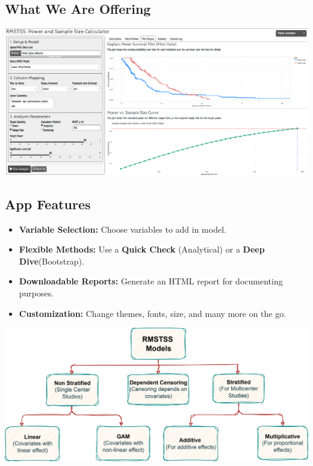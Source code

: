 \documentclass[a0,landscape]{a0poster}
\begin{document}
\hfill
\begin{minipage}[t]{0.54\linewidth}
    \subsection*{\huge What We Are Offering}
    \begin{center}
        \includegraphics[width=\linewidth]{images/app-ss.png}
    \end{center}
    \subsection*{\Large App Features}
    \begin{itemize}
        \item \large \textbf{Variable Selection:} Choose variables to add in model.
        \item \large \textbf{Flexible Methods:} Use a \textbf{Quick Check} (Analytical) or a \textbf{Deep Dive}(Bootstrap).
        \item \large \textbf{Downloadable Reports:} Generate an HTML report for documenting purposes.
        \item \large \textbf{Customization:} Change themes, fonts, size, and many more on the go.
    \end{itemize}
    
    \begin{center}
        \includegraphics[width=\linewidth,height = 0.4\linewidth]{images/app-models.png}
    \end{center}
    
\end{minipage}
\end{document}
